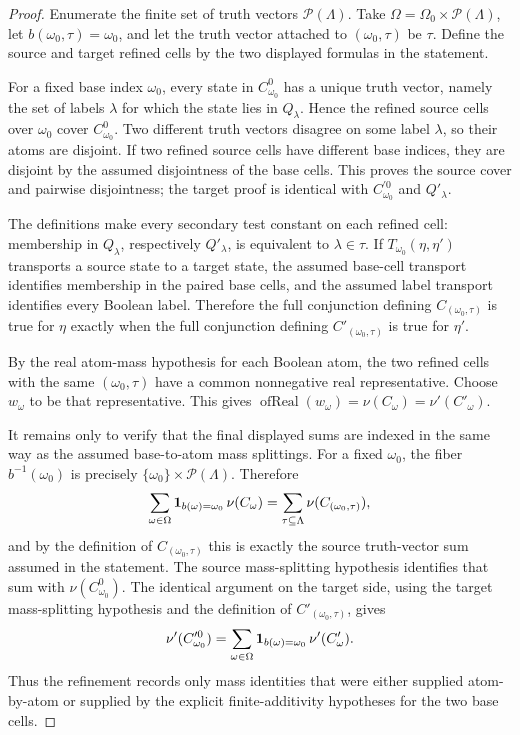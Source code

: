 \begin{proof}
Enumerate the finite set of truth vectors \(\mathcal P(\Lambda)\).  Take
\(\Omega=\Omega_0\times\mathcal P(\Lambda)\), let \(b(\omega_0,\tau)=\omega_0\),
and let the truth vector attached to \((\omega_0,\tau)\) be \(\tau\).  Define
the source and target refined cells by the two displayed formulas in the
statement.

For a fixed base index \(\omega_0\), every state in \(C^0_{\omega_0}\) has a
unique truth vector, namely the set of labels \(\lambda\) for which the state
lies in \(Q_\lambda\).  Hence the refined source cells over \(\omega_0\) cover
\(C^0_{\omega_0}\).  Two different truth vectors disagree on some label
\(\lambda\), so their atoms are disjoint.  If two refined source cells have
different base indices, they are disjoint by the assumed disjointness of the
base cells.  This proves the source cover and pairwise disjointness; the
target proof is identical with \(C^{\prime0}_{\omega_0}\) and \(Q'_\lambda\).

The definitions make every secondary test constant on each refined cell:
membership in \(Q_\lambda\), respectively \(Q'_\lambda\), is equivalent to
\(\lambda\in\tau\).  If \(T_{\omega_0}(\eta,\eta')\) transports a source state
to a target state, the assumed base-cell transport identifies membership in
the paired base cells, and the assumed label transport identifies every
Boolean label.  Therefore the full conjunction defining \(C_{(\omega_0,\tau)}\)
is true for \(\eta\) exactly when the full conjunction defining
\(C'_{(\omega_0,\tau)}\) is true for \(\eta'\).

By the real atom-mass hypothesis for each Boolean atom, the two refined cells
with the same \((\omega_0,\tau)\) have a common nonnegative real
representative.  Choose \(w_\omega\) to be that representative.  This gives
\(\operatorname{ofReal}(w_\omega)=\nu(C_\omega)=\nu'(C'_\omega)\).

It remains only to verify that the final displayed sums are indexed in the
same way as the assumed base-to-atom mass splittings.  For a fixed
\(\omega_0\), the fiber \(b^{-1}(\omega_0)\) is precisely
\(\{\omega_0\}\times\mathcal P(\Lambda)\).  Therefore
\[
\sum_{\omega\in\Omega}
 {\bf 1}_{b(\omega)=\omega_0}\,\nu(C_\omega)
=\sum_{\tau\subseteq\Lambda}
  \nu(C_{(\omega_0,\tau)}),
\]
and by the definition of \(C_{(\omega_0,\tau)}\) this is exactly the source
truth-vector sum assumed in the statement.  The source mass-splitting
hypothesis identifies that sum with \(\nu(C^0_{\omega_0})\).  The identical
argument on the target side, using the target mass-splitting hypothesis and
the definition of \(C'_{(\omega_0,\tau)}\), gives
\[
\nu'(C^{\prime0}_{\omega_0})
=\sum_{\omega\in\Omega}
 {\bf 1}_{b(\omega)=\omega_0}\,\nu'(C'_\omega).
\]
Thus the refinement records only mass identities that were either supplied
atom-by-atom or supplied by the explicit finite-additivity hypotheses for the
two base cells.
\end{proof}
